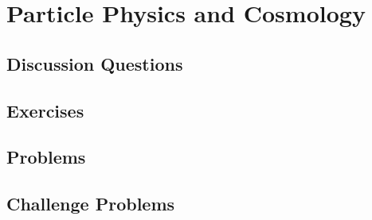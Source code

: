 
\chapter{Particle Physics and Cosmology}

\section{Discussion Questions}

\section{Exercises}

\section{Problems}

\section{Challenge Problems}
